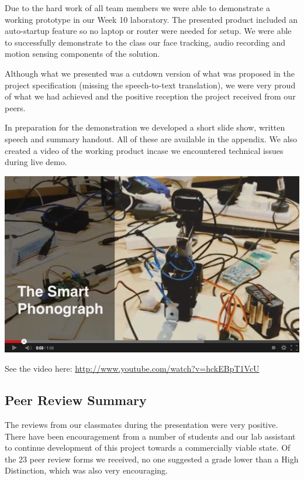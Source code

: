 \documentclass[11pt,a4paper,titlepage]{report}
\begin{document}
Due to the hard work of all team members we were able to demonstrate a working prototype in our Week 10 laboratory. The presented product included an auto-startup feature so no laptop or router were needed for setup. We were able to successfully demonstrate to the class our face tracking, audio recording and motion sensing components of the solution. 

Although what we presented was a cutdown version of what was proposed in the project specification (missing the speech-to-text translation), we were very proud of what we had achieved and the positive reception the project received from our peers.

In preparation for the  demonstration we developed a short slide show, written speech and summary handout. All of these are available in the appendix. We also created a video of the working product incase we encountered technical issues during live demo. 

\begin{center}
\href{http://www.youtube.com/watch?v=hckEBpT1VcU}{
    \includegraphics[width=\textwidth]{graphs/youtube.png}
}
\end{center}
See the video here: \url{http://www.youtube.com/watch?v=hckEBpT1VcU}



\subsection{Peer Review Summary}

The reviews from our classmates during the presentation were very positive. There have been encouragement from a number of students and our lab assistant to continue development of this project towards a commercially viable state. Of the 23 peer review forms we received, no one suggested a grade lower than a High Distinction, which was also very encouraging. 
\end{document}
